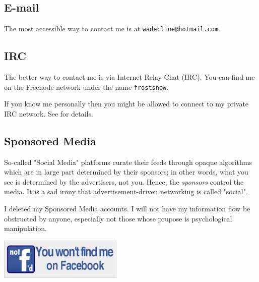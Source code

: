 \documentclass{article}
\begin{document}
\subsection{E-mail}
The most accessible way to contact me is at \texttt{wadecline@hotmail.com}.

\subsection{IRC}
The better way to contact me is via Internet Relay Chat (IRC).  You can find me on the Freenode network under the name \texttt{frostsnow}.

If you know me personally then you might be allowed to connect to my private IRC network.  See  for details.

\subsection{Sponsored Media}
So-called "Social Media" platforms curate their feeds through opaque algorithms which are in large part determined by their sponsors; in other words, what you see is determined by the advertisers, not you.  Hence, the \emph{sponsors} control the media.  It is a sad irony that advertisement-driven networking is called "social".

I deleted my Sponsored Media accounts.  I will not have my information flow be obstructed by anyone, especially not those whose prupose is psychological manipulation.

{\centering \includegraphics{files/no-facebook.png}}
\end{document}
